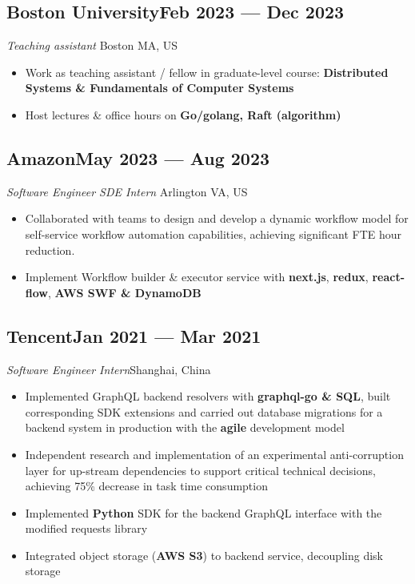 \documentclass[a4,12pt]{article}
\newcommand{\subtext}[1]{
#1\par\vspace{-0.3cm}}
\newenvironment{zitemize}{
\begin{itemize}\itemsep0pt \parskip0pt \parsep1pt}
{\end{itemize}\vspace{-0.5cm}}
\begin{document}
\vspace{-0.15cm}

\subsection*{\normalsize\textbf{Boston University}\hfill Feb 2023 --- Dec 2023}
\subtext{\textit{Teaching assistant} \hfill Boston MA, US}
    \begin{zitemize}
        \item Work as teaching assistant / fellow in graduate-level course: \textbf{Distributed Systems \& Fundamentals of Computer Systems}
        \item Host lectures \& office hours on \textbf{Go/golang, Raft (algorithm)}
    \end{zitemize}

\vspace{-0.1cm}

\subsection*{\normalsize\textbf{Amazon}\hfill May 2023 --- Aug 2023 } 
\subtext{\textit{Software Engineer SDE Intern} \hfill Arlington VA, US} 
    \begin{zitemize}
        \item Collaborated with teams to design and develop a dynamic workflow model for self-service workflow automation capabilities, achieving significant FTE hour reduction.
        \item Implement Workflow builder \& executor service with \textbf{next.js}, \textbf{redux}, \textbf{react-flow}, \textbf{AWS SWF \& DynamoDB}
    \end{zitemize}

\vspace{-0.1cm}


\subsection*{\normalsize\textbf{Tencent}\hfill Jan 2021 --- Mar 2021} 
\subtext{\textit{Software Engineer Intern}\hfill Shanghai, China} 
    \begin{zitemize}
        \item Implemented GraphQL backend resolvers with \textbf{graphql-go \& SQL}, built corresponding SDK extensions and carried out database migrations for a backend system in production with the \textbf{agile} development model
        \item Independent research and implementation of an experimental anti-corruption layer for up-stream dependencies to support critical technical decisions, achieving 75\% decrease in task time consumption
        \item Implemented \textbf{Python} SDK for the backend GraphQL interface with the modified requests library
        \item Integrated object storage (\textbf{AWS S3}) to backend service, decoupling disk storage
    \end{zitemize}
\end{document}
